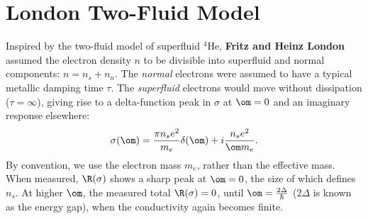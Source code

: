 \documentclass[qo.tex]{subfiles}
\begin{document}
\section{London Two-Fluid Model}
Inspired by the two-fluid model of superfluid $^4$He, \textbf{Fritz and Heinz London} assumed the electron density $n$ to be divisible into superfluid and normal components: $n=n_s+n_n$.
The \emph{normal} electrons were assumed to have a typical metallic damping time $\tau$.
The \emph{superfluid} electrons would move without dissipation ($\tau=\infty$), giving rise to a delta-function peak in $\sigma$ at $\om=0$ and an imaginary response elsewhere:
\begin{align}
    \sigma(\om) = \frac{\pi n_se^2}{m_e}\delta(\om) + i\frac{n_se^2}{\om m_e}.
\end{align}
By convention, we use the electron mass $m_e$, rather than the effective mass. 
When measured, $\R(\sigma)$ shows a sharp peak at $\om=0$, the size of which defines $n_s$.
At higher $\om$, the measured total $\R(\sigma)=0$, until $\om=\frac{2\Delta}{\hbar}$ ($2\Delta$ is known as the energy gap), when the conductivity again becomes finite. 
\end{document}

